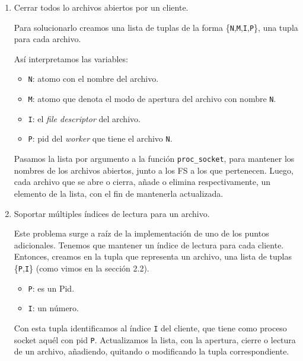 \documentclass[a4paper, 8pt]{article}
\begin{document}
\begin{enumerate}
%   
%   
  \item Cerrar todos lo archivos abiertos por un cliente.
  
  Para solucionarlo creamos una lista de tuplas de la forma \{\texttt{N},\texttt{M},\texttt{I},\texttt{P}\}, una tupla para cada archivo.
  
  Así interpretamos las variables:
  
  \begin{itemize}
    \item \texttt{N}: atomo con el nombre del archivo.
    \item \texttt{M}: atomo que denota el modo de apertura del archivo con nombre \texttt{N}.
    \item \texttt{I}: el \textit{file descriptor} del archivo.
    \item \texttt{P}: pid del \textit{worker} que tiene el archivo \texttt{N}.
  \end{itemize}
  
  Pasamos la lista por argumento a la función \texttt{proc\_socket}, para mantener los
  nombres de los archivos abiertos, junto a los FS a los que pertenecen.
  Luego, cada archivo que se abre o cierra, añade o elimina respectivamente, un elemento de la lista, con el fin de mantenerla actualizada.
  
  \item Soportar múltiples índices de lectura para un archivo.
  
  Este problema surge a raíz de la implementación de uno de los puntos adicionales. Tenemos que mantener un índice de lectura para cada cliente.
  Entonces, creamos en la tupla que representa un archivo, una lista de tuplas \{\texttt{P},\texttt{I}\} (como vimos en la sección 2.2).
  
  \begin{itemize}
    \item \texttt{P}: es un Pid.
    \item \texttt{I}: un número.
  \end{itemize}
  
  Con esta tupla identificamos al índice \texttt{I} del cliente, que tiene como proceso socket aquél con pid \texttt{P}.
  Actualizamos la lista, con la apertura, cierre o lectura de un archivo, añadiendo, quitando o modificando la tupla correspondiente.
  

\end{enumerate}
\end{document}
